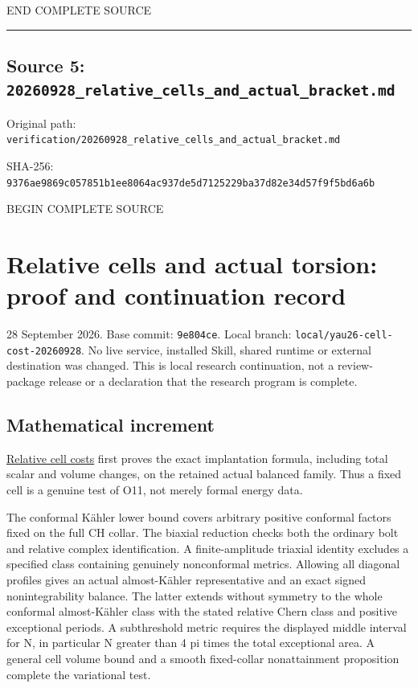 \documentclass[
  10pt,
]{article}
\begin{document}
END COMPLETE SOURCE

\begin{center}\rule{0.5\linewidth}{0.5pt}\end{center}

\hypertarget{source-5-20260928_relative_cells_and_actual_bracket.md}{%
\subsection{Source 5:
\nolinkurl{20260928_relative_cells_and_actual_bracket.md}}\label{source-5-20260928_relative_cells_and_actual_bracket.md}}

Original path:
\nolinkurl{verification/20260928_relative_cells_and_actual_bracket.md}

SHA-256:
\nolinkurl{9376ae9869c057851b1ee8064ac937de5d7125229ba37d82e34d57f9f5bd6a6b}

BEGIN COMPLETE SOURCE

\hypertarget{relative-cells-and-actual-torsion-proof-and-continuation-record}{%
\section{Relative cells and actual torsion: proof and continuation
record}\label{relative-cells-and-actual-torsion-proof-and-continuation-record}}

28 September 2026. Base commit: \texttt{9e804ce}. Local branch:
\nolinkurl{local/yau26-cell-cost-20260928}. No live service, installed
Skill, shared runtime or external destination was changed. This is local
research continuation, not a review-package release or a declaration
that the research program is complete.

\hypertarget{mathematical-increment-1}{%
\subsection{Mathematical increment}\label{mathematical-increment-1}}

\href{../continuation/20260928_relative_cell_cost.md}{Relative cell
costs} first proves the exact implantation formula, including total
scalar and volume changes, on the retained actual balanced family. Thus
a fixed cell is a genuine test of O11, not merely formal energy data.

The conformal Kähler lower bound covers arbitrary positive conformal
factors fixed on the full CH collar. The biaxial reduction checks both
the ordinary bolt and relative complex identification. A
finite-amplitude triaxial identity excludes a specified class containing
genuinely nonconformal metrics. Allowing all diagonal profiles gives an
actual almost-Kähler representative and an exact signed nonintegrability
balance. The latter extends without symmetry to the whole conformal
almost-Kähler class with the stated relative Chern class and positive
exceptional periods. A subthreshold metric requires the displayed middle
interval for N, in particular N greater than 4 pi times the total
exceptional area. A general cell volume bound and a smooth fixed-collar
nonattainment proposition complete the variational test.
\end{document}
